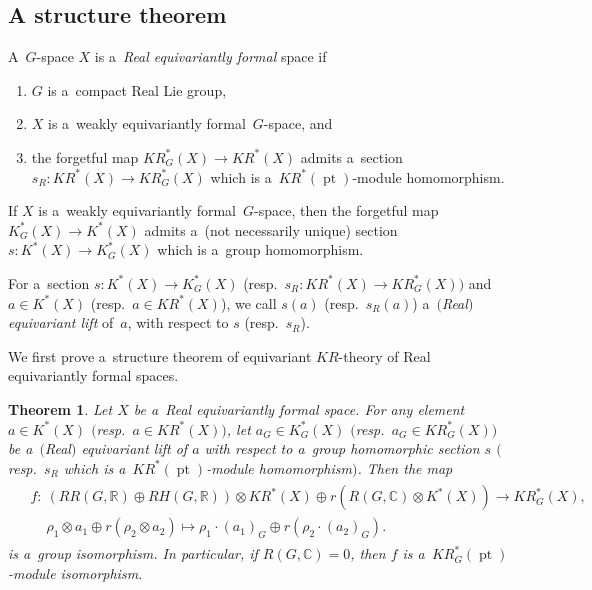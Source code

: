 \documentclass[pdftex]{sigma}
\numberwithin{equation}{section}
\newtheorem{Theorem}{Theorem}[section]
\DeclareMathOperator{\pt}{pt}
\begin{document}
\subsection{A structure theorem}
\begin{Definition}
\label{realequivformal}
A~$G$-space $X$ is a~\emph{Real equivariantly formal} space if
\begin{enumerate}\itemsep=0pt
\item[1)]
$G$ is a~compact Real Lie group,
\item[2)]
$X$ is a~weakly equivariantly formal~$G$-space, and
\item[3)]
the forgetful map $KR^*_G(X)\to KR^*(X)$ admits a~section $s_R: KR^*(X)\to KR^*_G(X)$ which is
a~$KR^*(\pt)$-module homomorphism.
\end{enumerate}
\end{Definition}
\begin{Remark}
If $X$ is a~weakly equivariantly formal~$G$-space, then the forgetful map $K_G^*(X)\to K^*(X)$ admits a~(not necessarily
unique) section $s: K^*(X)\to K_G^*(X)$ which is a~group homomorphism.
\end{Remark}
\begin{Definition}
For a~section $s: K^*(X)\to K^*_G(X)$ (resp.\
$s_R: KR^*(X)\to KR_G^*(X))$ and $a\in K^*(X)$ (resp.\
$a\in KR^*(X)$), we call $s(a)$ (resp.~$s_R(a)$) a~\emph{$($Real$)$ equivariant lift} of~$a$, with respect to $s$ (resp.~$s_R$).
\end{Definition}

We f\/irst prove a~structure theorem of equivariant $KR$-theory of Real equivariantly formal spaces.
\begin{Theorem}
\label{equivstrthm}
Let $X$ be a~Real equivariantly formal space.
For any element $a\in K^*(X)$ $($resp.\
$a\in KR^*(X))$, let $a_G\in K_G^*(X)$ $($resp.\
$a_G\in KR_G^*(X))$ be a~$($Real$)$ equivariant lift of $a$ with respect to a~group homomorphic section $s$ $($resp.~$s_R$ which is a~$KR^*(\pt)$-module homomorphism$)$.
Then the map
\begin{gather*}
\begin{split}
& f:  \ (RR(G, \mathbb{R})\oplus RH(G, \mathbb{R}))\otimes KR^*(X)\oplus r(R(G, \mathbb{C})\otimes K^*(X))  \to  KR_G^*(X),
\\
& \phantom{f: {}} \
\rho_1\otimes a_1\oplus r(\rho_2\otimes a_2)  \mapsto  \rho_1\cdot (a_1)_{G}\oplus r(\rho_2\cdot (a_2)_G).
\end{split}
\end{gather*}
is a~group isomorphism.
In particular, if $R(G, \mathbb{C})=0$, then $f$ is a~$KR_G^*(\pt)$-module isomorphism.
\end{Theorem}
\end{document}
